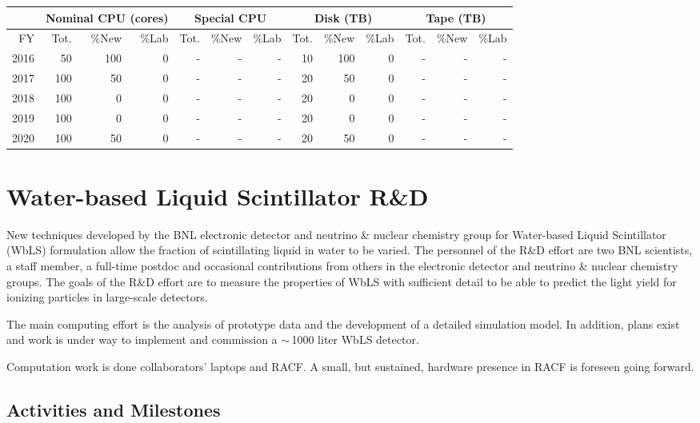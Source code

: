 \documentclass[pdftex,12pt,letter]{article}
\begin{document}
\begin{tabular}[h]{|r || r|r|r || r|r|r || r|r|r || r|r|r ||}
  \hline
   & \multicolumn{3}{c||}{Nominal CPU (cores)} & \multicolumn{3}{c||}{Special CPU} & \multicolumn{3}{c||}{Disk (TB)} & \multicolumn{3}{c||}{Tape (TB)} \\
   \hline
  FY & Tot. & \%New & \%Lab & Tot. & \%New & \%Lab & Tot. & \%New & \%Lab & Tot. & \%New & \%Lab \\
  \hline
  2016 & 50 &100 &0 &- &- &- & 10& 100&0 &- &- &- \\
  \hline
  2017 & 100& 50& 0&- &- &- & 20& 50&0 &- &- &-  \\
  \hline
  2018 & 100& 0& 0&- &- &- & 20& 0&0 &- &- &-  \\
  \hline
  2019 & 100& 0& 0&- &- &- & 20& 0&0 &- &- &-  \\
  \hline
  2020 & 100& 50& 0&- &- &- & 20& 50&0 &- &- &-  \\
  \hline
\end{tabular}

\pagebreak
\section{Water-based Liquid Scintillator R\&D}
New techniques developed by the BNL electronic detector and neutrino
\& nuclear chemistry group for Water-based Liquid Scintillator (WbLS)
formulation allow the fraction of scintillating liquid in water to be
varied. 
The personnel of the R\&D effort are two BNL scientists, a staff
member, a full-time postdoc and occasional contributions from others
in the electronic detector and neutrino \& nuclear chemistry groups.   
The goals of the R\&D effort are to measure the properties of WbLS
with sufficient detail to be able to predict the light yield for
ionizing particles in large-scale detectors.

The main computing effort is the analysis of prototype data and the development of a detailed
simulation model. In addition, plans exist and work is under way to implement and commission a 
$\sim$\,1000 liter WbLS detector.

Computation work is done collaborators' laptops and RACF. A small, but sustained, hardware
presence in RACF is foreseen going forward.

\subsection{Activities and Milestones}
\end{document}
